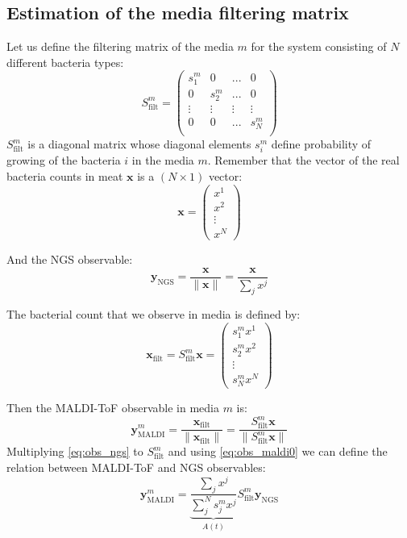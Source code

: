 \documentclass[10pt,A4paper]{article}
\begin{document}
\subsection{Estimation of the media filtering matrix}

Let us define the filtering matrix of the media $m$ for the system consisting of $N$ different bacteria types:
\begin{equation}
    S^m_\text{filt} = \begin{pmatrix}
        s^m_1  & 0       & ...    & 0      \\
        0      & s^m_2   & ...    & 0      \\
        \vdots & \vdots  & \vdots & \vdots \\
        0      & 0       & ...    & s^m_N  \\
    \end{pmatrix}
\end{equation}
$S^m_\text{filt}$ is a diagonal matrix whose diagonal elements $s^m_i$ define probability of growing of the  bacteria $i$ in the media $m$.
Remember that the vector of the real bacteria counts in meat $\mathbf{x}$ is a $( N \times 1)$ vector:
\begin{equation}
    \mathbf{x} = \begin{pmatrix} x^1 \\ x^2 \\ \vdots \\ x^N
    \end{pmatrix}
\end{equation}

And the NGS observable:
\begin{equation}
    \mathbf{y}_\text{NGS} = \frac{\mathbf{x}}{\lVert \mathbf{x} \rVert} = \frac{\mathbf{x}}{\sum_j x^j}
    \label{eq:obs_ngs}
\end{equation}

The bacterial count that we observe in media is defined by:
\begin{equation}
    \mathbf{x}_\text{filt} = S^m_\text{filt} \mathbf{x} = \begin{pmatrix} s^m_1 x^1 \\ s^m_2 x^2 \\ \vdots \\ s^m_N x^N \end{pmatrix}   
\end{equation}

Then the MALDI-ToF observable in media $m$ is:
\begin{equation}
    \mathbf{y}^m_\text{MALDI} = \frac{\mathbf{x}_\text{filt}}{\lVert \mathbf{x}_\text{filt} \rVert} = \frac{ S^m_\text{filt} \mathbf{x}}{\lVert S^m_\text{filt} \mathbf{x} \rVert}
    \label{eq:obs_maldi0}
\end{equation}
Multiplying \ref{eq:obs_ngs} to $S^m_\text{filt}$ and using \ref{eq:obs_maldi0} we can define the relation between MALDI-ToF and NGS observables:
\begin{equation}
    \mathbf{y}^m_\text{MALDI} = \underbrace{\frac{\sum_j x^j}{\sum_j^N s^m_j x^j}}_{A(t)} S^m_\text{filt} \mathbf{y}_\text{NGS}
\end{equation}
\end{document}
